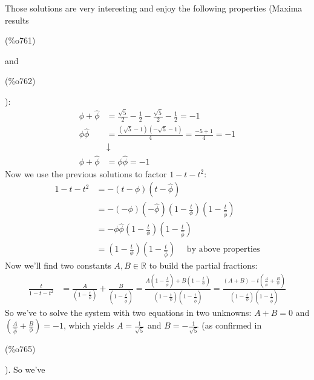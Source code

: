 Those solutions are very interesting and enjoy the following
properties (Maxima results \parbox{8ex}{\color{labelcolor}(\%o761) }
and \parbox{8ex}{\color{labelcolor}(\%o762) }):
\begin{displaymath}
  \begin{split}
    \phi + \hat{\phi} &= \frac{\sqrt{5}}{2} - \frac{1}{2} -
    \frac{\sqrt{5}}{2} - \frac{1}{2} = -1\\
    \phi \hat{\phi} &= \frac{(\sqrt{5} -1)(-\sqrt{5} -1)}{4} =
    \frac{-5+1}{4} = -1\\
    &\downarrow\\
    \phi + \hat{\phi} &= \phi \hat{\phi} = -1
  \end{split}
\end{displaymath}
Now we use the previous solutions to factor $1-t-t^2$:
\begin{displaymath}
  \begin{split}
    1-t-t^2 &= -\left( t-\phi \right)\left( t-\hat{\phi} \right)\\
    &= -(-\phi)(-\hat{\phi})\left(1 - \frac{t}{\phi} \right)
    \left(1 - \frac{t}{\hat{\phi}} \right)\\
    &= -\phi\hat{\phi}\left(1 - \frac{t}{\phi} \right)
    \left(1 - \frac{t}{\hat{\phi}} \right)\\
    &= \left(1 - \frac{t}{\phi} \right) \left(1 - \frac{t}{\hat{\phi}}
    \right) \quad \text{ by above properties}
  \end{split}
\end{displaymath}
Now we'll find two constants $A, B \in \mathbb{R} $ to build the
partial fractions:
\begin{displaymath}
  \begin{split}
    \frac{t}{1-t-t^2} &= \frac{A}{\left(1 - \frac{t}{\phi} \right)} +
    \frac{B}{ \left(1 - \frac{t}{\hat{\phi}} \right)}= \frac{A \left(1
        - \frac{t}{\hat{\phi}} \right) + B\left(1 - \frac{t}{\phi}
      \right)}{\left(1 - \frac{t}{\phi} \right) \left(1 -
        \frac{t}{\hat{\phi}} \right)} = \frac{(A+B) -t
      \left(\frac{A}{\hat{\phi}} +\frac{B}{\phi}
      \right)}{\left(1 - \frac{t}{\phi} \right) \left(1 -
        \frac{t}{\hat{\phi}} \right)}
  \end{split}
\end{displaymath}
So we've to solve the system with two equations in two unknowns:
$A+B=0$ and $\left(\frac{A}{\hat{\phi}} +\frac{B}{\phi} \right) = -1$,
which yields $A= \frac{1}{\sqrt{5}} $ and $B= -\frac{1}{\sqrt{5}}$ (as
confirmed in \parbox{8ex}{\color{labelcolor}(\%o765) }). So we've
